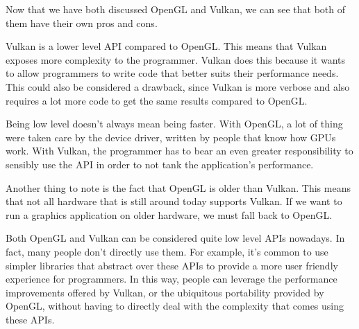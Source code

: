 Now that we have both discussed OpenGL and Vulkan, we can see that both of
them have their own pros and cons.

Vulkan is a lower level API compared to OpenGL.
This means that Vulkan exposes more complexity to the programmer.
Vulkan does this because it wants to allow programmers to write code that
better suits their performance needs.
This could also be considered a drawback, since Vulkan is more verbose and
also requires a lot more code to get the same results compared to OpenGL.

Being low level doesn't always mean being faster.
With OpenGL, a lot of thing were taken care by the device driver, written
by people that know how GPUs work.
With Vulkan, the programmer has to bear an even greater responsibility
to sensibly use the API in order to not tank the application's performance.

Another thing to note is the fact that OpenGL is older than Vulkan.
This means that not all hardware that is still around today supports Vulkan.
If we want to run a graphics application on older hardware, we must fall back
to OpenGL.

Both OpenGL and Vulkan can be considered quite low level APIs nowadays.
In fact, many people don't directly use them.
For example, it's common to use simpler libraries that abstract over these
APIs to provide a more user friendly experience for programmers.
In this way, people can leverage the performance improvements offered by Vulkan,
or the ubiquitous portability provided by OpenGL, without having to directly deal
with the complexity that comes using these APIs.
